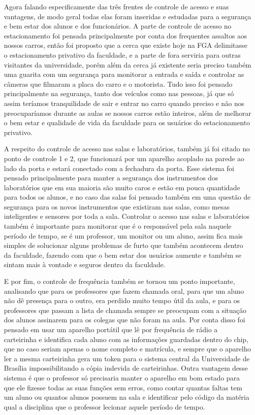 Agora falando especificamente das três frentes de controle de acesso e suas
vantagens, de modo geral todas elas foram inseridas e estudadas para a segurança
e bem estar dos alunos e dos funcionários. A parte de controle de acesso no
estacionamento foi pensada principalmente por conta dos frequentes assaltos aos
nossos carros, então foi proposto que a cerca que existe hoje na FGA delimitasse
o estacionamento privativo da faculdade, e a parte de fora serviria para outras
visitantes da universidade, porém além da cerca já existente seria preciso
também uma guarita com um segurança para monitorar a entrada e saída e controlar
as câmeras que filmaram a placa do carro e o motorista. Tudo isso foi pensado
principalmente na segurança, tanto dos veículos como nas pessoas, já que só
assim teríamos tranquilidade de sair e entrar no carro quando preciso e não nos
preocuparíamos durante as aulas se nossos carros estão inteiros, além de
melhorar o bem estar e qualidade de vida da faculdade para os usuários do
estacionamento privativo.

A respeito do controle de acesso nas salas e laboratórios, também já foi citado
no ponto de controle 1 e 2, que funcionará por um aparelho acoplado na parede ao
lado da porta e estará conectado com a fechadura da porta. Esse sistema foi
pensado principalmente para manter a segurança dos instrumentos dos laboratórios
que em sua maioria são muito caros e estão em pouca quantidade para todos os
alunos, e no caso das salas foi pensado também em uma questão de segurança para
os novos instrumentos que existiram nas salas, como mesas inteligentes e
sensores por toda a sala. Controlar o acesso nas salas e laboratórios também é
importante para monitorar que é o responsável pela sala naquele período de
tempo, se é um professor, um monitor ou um aluno, assim fica mais simples de
solucionar alguns problemas de furto que também acontecem dentro da faculdade,
fazendo com que o bem estar dos usuários aumente e também se sintam mais à
vontade e seguros dentro da faculdade.

E por fim, o controle de frequência também se tornou um ponto importante,
analisando que para os professores que fazem chamada oral, para que um aluno não
dê presença para o outro, era perdido muito tempo útil da aula, e para os
professores que passam a lista de chamada sempre se preocupam com a situação dos
alunos assinarem para os colegas que não foram na aula. Por conta disso foi
pensado em usar um aparelho portátil que lê por frequência de rádio a
carteirinha e identifica cada aluno com as informações guardadas dentro do chip,
que no caso seriam apenas o nome completo e matrícula, e sempre que o aparelho
ler a mesma carteirinha gera um token para o sistema central da Universidade de
Brasília impossibilitando a cópia indevida de carteirinhas. Outra vantagem desse
sistema é que o professor só precisaria manter o aparelho em bom estado para que
ele fizesse todas as suas funções sem erros, como contar quantas faltas tem um
aluno ou quantos alunos possuem na sala e identificar pelo código da matéria
qual a disciplina que o professor lecionar aquele período de tempo.


